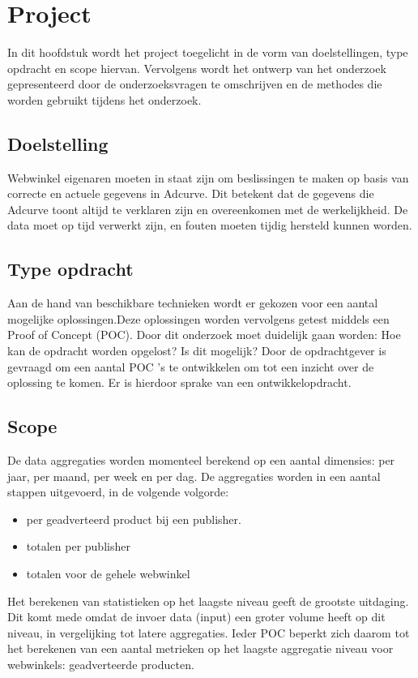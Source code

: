 \chapter{Project}
\label{ch:project}

In dit hoofdstuk wordt het project toegelicht in de vorm van doelstellingen, type opdracht en scope hiervan. Vervolgens wordt het ontwerp van het onderzoek gepresenteerd door de onderzoeksvragen te omschrijven en de methodes die worden gebruikt tijdens het onderzoek.

\section{Doelstelling} %
\label{sec:doelstelling}

Webwinkel eigenaren moeten in staat zijn om beslissingen te maken op basis van correcte en actuele gegevens in Adcurve. Dit betekent dat de gegevens die Adcurve toont altijd te verklaren zijn en overeenkomen met de werkelijkheid. De data moet op tijd verwerkt zijn, en fouten moeten tijdig hersteld kunnen worden.

\section{Type opdracht}

Aan de hand van beschikbare technieken wordt er gekozen voor een aantal mogelijke oplossingen.\newline Deze oplossingen worden vervolgens getest middels een Proof of Concept (POC). Door dit onderzoek moet duidelijk gaan worden: Hoe kan de opdracht worden opgelost? Is dit mogelijk? Door de opdrachtgever is gevraagd om een aantal POC 's te ontwikkelen om tot een inzicht over de oplossing te komen. Er is hierdoor sprake van een ontwikkelopdracht.


\section{Scope}

De data aggregaties worden momenteel berekend op een aantal dimensies: per jaar, per maand, per week en per dag. De aggregaties worden in een aantal stappen uitgevoerd, in de volgende volgorde:
\begin{itemize}
\item per geadverteerd product bij een publisher.
\item totalen per publisher
\item totalen voor de gehele webwinkel
\end{itemize}
Het berekenen van statistieken op het laagste niveau geeft de grootste uitdaging. Dit komt mede omdat de invoer data (input) een groter volume heeft op dit niveau, in vergelijking tot latere aggregaties. Ieder POC beperkt zich daarom tot het berekenen van een aantal metrieken op het laagste aggregatie niveau voor webwinkels: geadverteerde producten.

